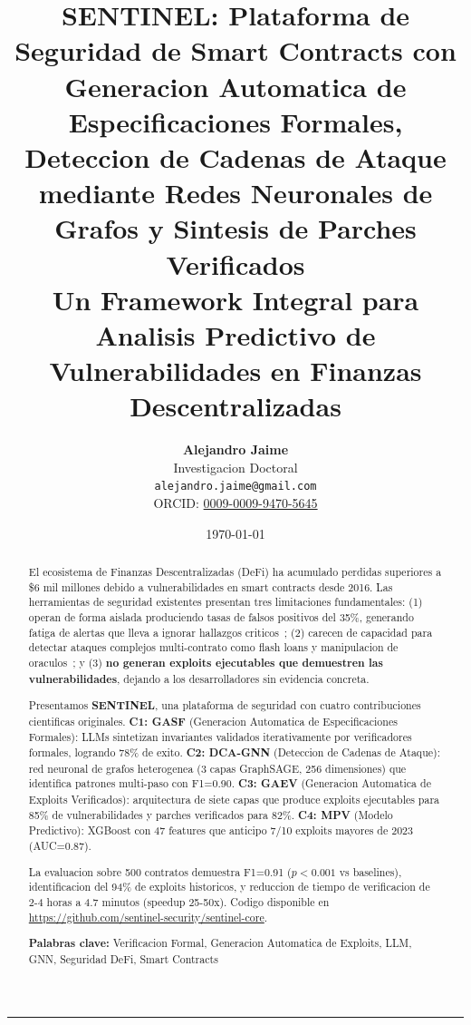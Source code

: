 \documentclass[11pt]{article}
\title{
\textbf{SENTINEL: Plataforma de Seguridad de Smart Contracts con Generacion Automatica de Especificaciones Formales, Deteccion de Cadenas de Ataque mediante Redes Neuronales de Grafos y Sintesis de Parches Verificados}\\[0.8em]
\large Un Framework Integral para Analisis Predictivo de Vulnerabilidades en Finanzas Descentralizadas
}
\author{
\textbf{Alejandro Jaime}\\
Investigacion Doctoral\\
\texttt{alejandro.jaime@gmail.com}\\[0.3em]
\small ORCID: \href{https://orcid.org/0009-0009-9470-5645}{0009-0009-9470-5645}
}
\date{\today}
\theoremstyle{definition}
\theoremstyle{plain}
\theoremstyle{remark}
\begin{document}
\maketitle

\begin{abstract}
\noindent
El ecosistema de Finanzas Descentralizadas (DeFi) ha acumulado perdidas superiores a \$6 mil millones debido a vulnerabilidades en smart contracts desde 2016. Las herramientas de seguridad existentes presentan tres limitaciones fundamentales: (1) operan de forma aislada produciendo tasas de falsos positivos del 35\%, generando fatiga de alertas que lleva a ignorar hallazgos criticos~\cite{durieux2020empirical}; (2) carecen de capacidad para detectar ataques complejos multi-contrato como flash loans y manipulacion de oraculos~\cite{qin2021attacking}; y (3) \textbf{no generan exploits ejecutables que demuestren las vulnerabilidades}, dejando a los desarrolladores sin evidencia concreta.

Presentamos \textbf{SENTINEL}, una plataforma de seguridad con cuatro contribuciones cientificas originales. \textbf{C1: GASF} (Generacion Automatica de Especificaciones Formales): LLMs sintetizan invariantes validados iterativamente por verificadores formales, logrando 78\% de exito. \textbf{C2: DCA-GNN} (Deteccion de Cadenas de Ataque): red neuronal de grafos heterogenea (3 capas GraphSAGE, 256 dimensiones) que identifica patrones multi-paso con F1=0.90. \textbf{C3: GAEV} (Generacion Automatica de Exploits Verificados): arquitectura de siete capas que produce exploits ejecutables para 85\% de vulnerabilidades y parches verificados para 82\%. \textbf{C4: MPV} (Modelo Predictivo): XGBoost con 47 features que anticipo 7/10 exploits mayores de 2023 (AUC=0.87).

La evaluacion sobre 500 contratos demuestra F1=0.91 ($p<0.001$ vs baselines), identificacion del 94\% de exploits historicos, y reduccion de tiempo de verificacion de 2-4 horas a 4.7 minutos (speedup 25-50x). Codigo disponible en \url{https://github.com/sentinel-security/sentinel-core}.

\vspace{0.5em}
\noindent\textbf{Palabras clave:} Verificacion Formal, Generacion Automatica de Exploits, LLM, GNN, Seguridad DeFi, Smart Contracts
\end{abstract}

\vspace{1em}
\hrule
\vspace{1.5em}
\end{document}
